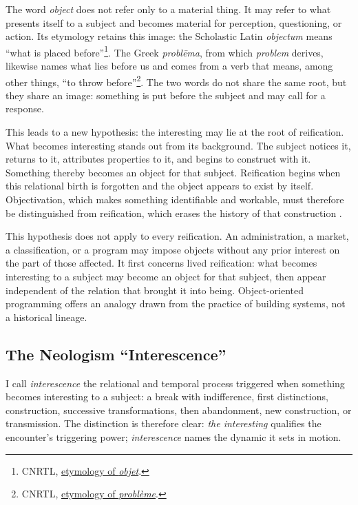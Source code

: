 \documentclass[11pt,a4paper]{article}
\begin{document}
The word \emph{object} does not refer only to a material thing. It may refer to
what presents itself to a subject and becomes material for perception,
questioning, or action. Its etymology retains this image: the Scholastic Latin
\emph{objectum} means ``what is placed before''\footnote{CNRTL,
\href{https://www.cnrtl.fr/etymologie/objet}{etymology of \emph{objet}}.}.
The Greek \emph{problēma}, from which \emph{problem} derives, likewise names
what lies before us and comes from a verb that means, among other things, ``to
throw before''\footnote{CNRTL,
\href{https://www.cnrtl.fr/etymologie/probleme}{etymology of
\emph{problème}}.}. The two words do not share the same root, but they share an
image: something is put before the subject and may call for a response.

This leads to a new hypothesis: the interesting may lie at the root of
reification. What becomes interesting stands out from its background. The
subject notices it, returns to it, attributes properties to it, and begins to
construct with it. Something thereby becomes an object for that subject.
Reification begins when this relational birth is forgotten and the object
appears to exist by itself. Objectivation, which makes something identifiable
and workable, must therefore be distinguished from reification, which erases
the history of that construction \parencite{pachet2004reification}.

This hypothesis does not apply to every reification. An administration, a
market, a classification, or a program may impose objects without any prior
interest on the part of those affected. It first concerns lived reification:
what becomes interesting to a subject may become an object for that subject,
then appear independent of the relation that brought it into being.
Object-oriented programming offers an analogy drawn from the practice of
building systems, not a historical lineage.

\subsection{The Neologism ``Interescence''}

I call \emph{interescence} the relational and temporal process triggered when
something becomes interesting to a subject: a break with indifference, first
distinctions, construction, successive transformations, then abandonment,
new construction, or transmission. The distinction is therefore clear: \emph{the
interesting} qualifies the encounter's triggering power; \emph{interescence}
names the dynamic it sets in motion.
\end{document}
